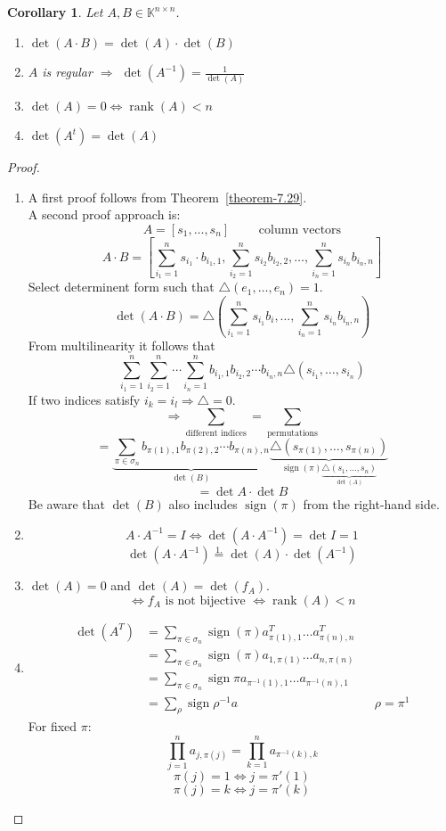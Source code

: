 \documentclass[a4paper,landscape,twocolumn]{article}
\newtheorem{cor}{Corollary}
\DeclareMathOperator\rank{rank} %
\DeclareMathOperator\sign{sign}
\begin{document}
\begin{cor}
  \label{cor-7.30}
  Let $A,B \in \mathbb K^{n\times n}$.
  \begin{enumerate}
    \item $\det(A \cdot B) = \det(A) \cdot \det(B)$
    \item $A$ is regular $\Rightarrow$ $\det(A^{-1}) = \frac{1}{\det(A)}$
    \item $\det(A) = 0 \Leftrightarrow \rank(A) < n$
    \item $\det(A^t) = \det(A)$
  \end{enumerate}
\end{cor}
\begin{proof}
  \begin{enumerate}
    \item A first proof follows from Theorem~\ref{theorem-7.29}. \\
      A second proof approach is:
      \[ A = [s_1, \ldots, s_n] \qquad \text{ column vectors} \]
      \[ A \cdot B = \left[\sum_{i_1=1}^n s_{i_1} \cdot b_{i_1,1}, \sum_{i_2=1}^n s_{i_2} b_{i_2,2}, \ldots, \sum_{i_n=1}^n s_{i_n} b_{i_n,n}\right] \]
      Select determinent form such that $\triangle(e_1, \ldots, e_n) = 1$.
      \[ \det(A \cdot B) = \triangle\left(\sum_{i_1=1}^n s_{i_1} b_{i}, \ldots, \sum_{i_n=1}^n s_{i_n} b_{i_n,n}\right) \]
      From multilinearity it follows that
      \[ \sum_{i_1=1}^n \sum_{i_2=1}^n \cdots \sum_{i_n=1}^n b_{i_1,1} b_{i_2,2} \cdots b_{i_n,n} \triangle (s_{i_1}, \ldots, s_{i_n}) \]
      If two indices satisfy $i_k = i_l \Rightarrow \triangle = 0$.
      \[ \Rightarrow \sum_{\text{different indices}} = \sum_{\text{permutations}} \]
      \[ = \underbrace{\sum_{\pi \in \sigma_n} b_{\pi(1),1} b_{\pi(2),2} \cdots b_{\pi(n),n}}_{\det(B)} \underbrace{\triangle(s_{\pi(1)}, \ldots, s_{\pi(n)})}_{\sign(\pi) \underbrace{\triangle(s_1, \ldots, s_n)}_{\det(A)}} \]
      \[ = \det{A} \cdot \det{B} \]
      Be aware that $\det(B)$ also includes $\sign(\pi)$ from the right-hand side.
    \item
      \[ A \cdot A^{-1} = I \Leftrightarrow \det(A \cdot A^{-1}) = \det{I} = 1 \]
      \[ \det(A \cdot A^{-1}) \overset{\text{1.}}= \det(A) \cdot \det(A^{-1}) \]
    \item
      $\det(A) = 0$ and $\det(A) = \det(f_A)$.
      \[ \Leftrightarrow f_A \text{ is not bijective } \Leftrightarrow \rank(A) < n \]
    \item
      \begin{align*}
        \det(A^T)
          &= \sum_{\pi \in \sigma_n} \sign(\pi) a^T_{\pi(1),1} \ldots a^T_{\pi(n),n} \\
          &= \sum_{\pi \in \sigma_n} \sign(\pi) a_{1,\pi(1)} \ldots a_{n,\pi(n)} \\
          &= \sum_{\pi \in \sigma_n} \sign{\pi} a_{\pi^{-1}(1),1} \ldots a_{\pi^{-1}(n),1} \\
          &= \sum_{\rho} \sign{\rho^{-1}} a
          & & \rho = \pi^{1}
      \end{align*}
      For fixed $\pi$:
      \[ \prod_{j=1}^n a_{j,\pi(j)} = \prod_{k=1}^n a_{\pi^{-1}(k),k} \]
      \[ \pi(j) = 1 \Leftrightarrow j = \pi'(1) \]
      \[ \pi(j) = k \Leftrightarrow j = \pi'(k) \]


\end{enumerate}
\end{proof}
\end{document}
